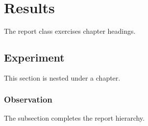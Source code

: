 \documentclass{report}
\def\tableofcontents{}
\begin{document}
\tableofcontents

\chapter{Results}
The report class exercises chapter headings.

\section{Experiment}
This section is nested under a chapter.

\subsection{Observation}
The subsection completes the report hierarchy.
\end{document}
